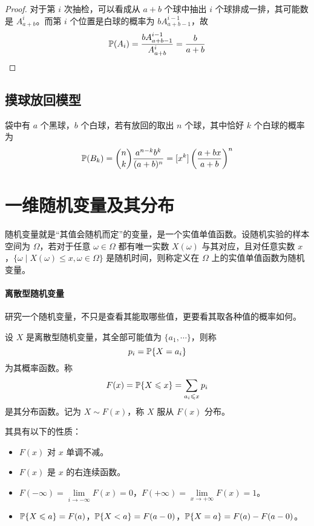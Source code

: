 \begin{proof}
	对于第 $i$ 次抽检，可以看成从 $a+b$ 个球中抽出 $i$ 个球排成一排，其可能数是 $A_{a+b}^i$。而第 $i$ 个位置是白球的概率为 $b A_{a+b-1}^{i-1}$，故
	\[ \mathbb{P}(A_i) = \frac{b A_{a+b-1}^{i-1}}{A_{a+b}^i} = \frac{b}{a+b} \]
\end{proof}

\subsection{摸球放回模型}

袋中有 $a$ 个黑球，$b$ 个白球，若有放回的取出 $n$ 个球，其中恰好 $k$ 个白球的概率为
\[ \mathbb{P}(B_k) = \binom{n}{k} \frac{a^{n-k} b^k}{(a+b)^n} = [x^k] \left(\frac{a + bx}{a+b}\right)^n \]

\section{一维随机变量及其分布}

随机变量就是“其值会随机而定”的变量，是一个实值单值函数。设随机实验的样本空间为 $\Omega$，若对于任意 $\omega \in \Omega$ 都有唯一实数 $X(\omega)$ 与其对应，且对任意实数 $x$，$\{\omega \mid X(\omega) \leqslant x, \omega \in \Omega\}$ 是随机时间，则称定义在 $\Omega$ 上的实值单值函数为随机变量。

\paragraph{离散型随机变量}

研究一个随机变量，不只是查看其能取哪些值，更要看其取各种值的概率如何。

\begin{definition}
	设 $X$ 是离散型随机变量，其全部可能值为 $\{a_1, \cdots\}$，则称
	\[ p_i = \mathbb{P}\{X = a_i\} \]
	为其概率函数。称
	\[ F(x) = \mathbb{P}\{X \leqslant x\} = \sum_{a_i \leqslant x} p_i \]
	是其分布函数。记为 $X \sim F(x)$，称 $X$ 服从 $F(x)$ 分布。
\end{definition}

其具有以下的性质：

\begin{itemize}
	\item $F(x)$ 对 $x$ 单调不减。
	\item $F(x)$ 是 $x$ 的右连续函数。
	\item $F(- \infty) = \lim\limits_{i \to -\infty} F(x) = 0$，$F(+\infty) = \lim\limits_{x \to + \infty} F(x) = 1$。
	\item $\mathbb{P}\{X \leqslant a\} = F(a)$，$\mathbb{P}\{X < a\} = F(a - 0)$，$\mathbb{P}\{X = a\} = F(a) - F(a - 0)$。
\end{itemize}

